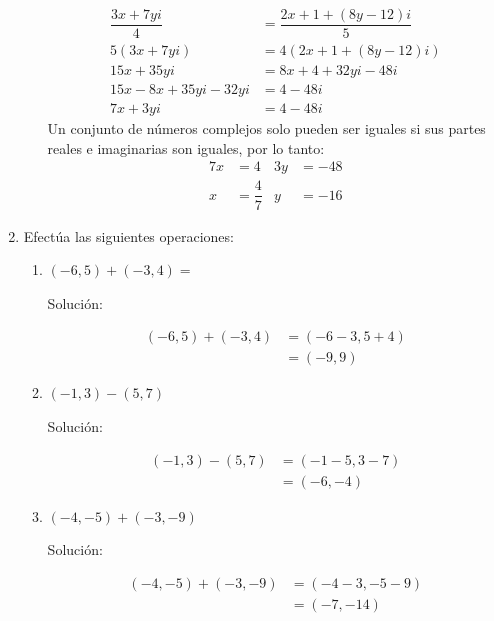 \documentclass{article}
\theoremstyle{definition}
\begin{document}
\begin{enumerate}
\begin{enumerate}
\begin{align*}
                \dfrac{3x+7yi}{4} &= \dfrac{2x+1+(8y - 12)i}{5} \\
                5(3x+7yi) &= 4(2x+1+(8y - 12)i) \\
                15x+35yi &= 8x+4+32yi-48i \\
                15x-8x+35yi - 32yi &= 4-48i \\
                7x+3yi &= 4-48i
            \end{align*}
            Un conjunto de números complejos solo pueden ser iguales si sus partes reales e imaginarias son iguales, por lo tanto:
            \newline
            \begin{align*}
                7x &= 4 &3y &= -48 \\
                x &= \boxed{\dfrac{4}{7}} &y &= \boxed{-16}
            \end{align*}
        \end{enumerate}
        \item Efectúa las siguientes operaciones:
        \begin{enumerate}
            \item $(-6, 5) + (-3, 4) =$
            \begin{center}
                Solución:
            \end{center}
            \begin{align*}
                (-6, 5) + (-3, 4) &= (-6-3, 5+4) \\
                &= \boxed{(-9, 9)}
            \end{align*}
            \item $(-1, 3) - (5, 7)$
            \begin{center}
                Solución:   
            \end{center}
            \begin{align*}
                (-1, 3) - (5, 7) &= (-1-5, 3-7) \\
                &= \boxed{(-6, -4)}
            \end{align*}
            \item $(-4, -5) + (-3, -9)$
            \begin{center}
                Solución:
            \end{center}
            \begin{align*}
                (-4, -5) + (-3, -9) &= (-4-3, -5-9) \\
                &= \boxed{(-7, -14)}
            \end{align*}

\end{enumerate}
\end{enumerate}
\end{document}
